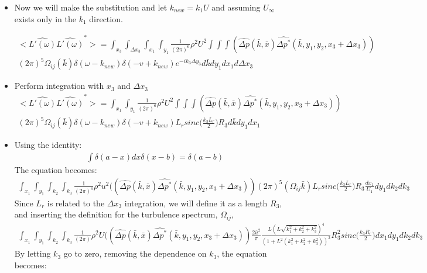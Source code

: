 \documentclass{article}
\begin{document}
\begin{itemize}
\item Now we will make the substitution and let $k_{new} = k_1 U$ and assuming $U_\infty$ exists only in the $k_1$ direction.

\begin{align*}
\Big<\hat{L'(\omega)}\hat{L'(\omega)}^*\Big> =  \int_{x_3} \int_{\Delta x_3} \int_{x_1} \int_{y_1} \frac{1}{(2\pi)^6}\rho^2 U^2 \int \int \int (\hat{\Delta p}(\bar{k},\bar{x})\hat{\Delta p^*}(\bar{k},y_1,y_2,x_3 + \Delta x_3))\\(2\pi)^5 \Omega_{ij}(\bar{k})\delta(\omega - k_{new})\delta(-v+k_{new})e^{-ik_3 \Delta y_3} d\bar{k} dy_1 dx_1 d\Delta x_3
\end{align*}

\item Perform integration with $x_3$ and $\Delta x_3$
\begin{align*}
\Big<\hat{L'(\omega)}\hat{L'(\omega)}^*\Big> = \int_{x_1} \int_{y_1} \frac{1}{(2\pi)^6}\rho^2 U^2 \int \int \int (\hat{\Delta p}(\bar{k},\bar{x})\hat{\Delta p^*}(\bar{k},y_1,y_2,x_3 + \Delta x_3))\\(2\pi)^5 \Omega_{ij}(\bar{k})\delta(\omega - k_{new})\delta(-v+k_{new})L_r sinc\Big(\frac{k_3L_r}{2}\Big) R_3  d\bar{k} dy_1 dx_1
\end{align*}
\item Using the identity:
\begin{align*}
\int \delta(a-x)dx \delta(x-b) = \delta(a-b)
\end{align*}
The equation becomes:
\begin{align*}
\int_{x_1} \int_{y_1} \int_{k_2} \int_{k_3} \frac{1}{(2\pi)^6}\rho^2 u^2 ( (\hat{\Delta p}(\bar{k},\bar{x})\hat{\Delta p^*}(\bar{k},y_1,y_2,x_3+\Delta x_3))(2\pi)^5 (\Omega_{ij}\bar{k})L_r sinc\Big(\frac{k_3L_r}{2}\Big) R_3 \frac{dx_1}{U_1}dy_1dk_2dk_3
\end{align*}
Since $L_r$ is related to the $\Delta x_3$ integration, we will define it as a length $R_3$, and inserting the definition for the turbulence spectrum, $\Omega_{ij}$,
\begin{align*}
\int_{x_1} \int_{y_1} \int_{k_2} \int_{k_3} \frac{1}{(2\pi)}\rho^2 U ( (\hat{\Delta p}(\bar{k},\bar{x})\hat{\Delta p^*}(\bar{k},y_1,y_2,x_3+\Delta x_3)) \frac{2\bar{u}^2}{\pi}\frac{L(L\sqrt{k_1^2+k_2^2+k_3^2})^4}{(1+L^2(k_1^2+k_2^2+k_3^2))^3}R_3^2 sinc\Big(\frac{k_3R_r}{2}\Big) dx_1 dy_1dk_2dk_3
\end{align*}
By letting $k_3$ go to zero, removing the dependence on $k_3$,  the equation becomes: 
\begin{align*}

\end{align*}
\end{itemize}
\end{document}
